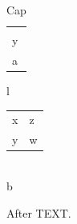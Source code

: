 \documentclass{article}
\begin{document}
\begin{longtable}{l}
\caption{Cap} \begin{tabular}{l} x \\ y \end{tabular}\\
a \\
\end{longtable}
\begin{longtable}{l}
\caption{Two} \begin{tabular}{ll} x & z \\ y & w\end{tabular}\\
b \\
\end{longtable}
After TEXT.
\end{document}
